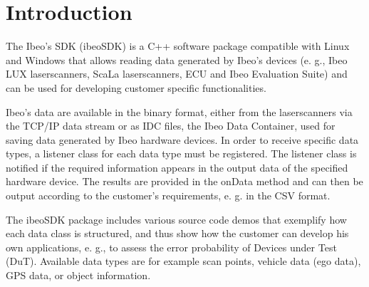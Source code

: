 \section{Introduction}

The Ibeo’s SDK (ibeoSDK) is a C++ software package compatible with Linux and Windows that allows reading data generated by Ibeo's devices (e. g., Ibeo LUX laserscanners,
ScaLa laserscanners, ECU and Ibeo Evaluation Suite) and can be used for developing customer specific functionalities. \hfill \break

Ibeo's data are available in the binary format, either from the laserscanners via the TCP/IP data stream or as IDC files, the Ibeo Data Container, used for saving data generated by Ibeo hardware devices.
In order to receive specific data types, a listener class for each data type must be registered. The listener class is notified if the required information appears in the output data of the specified hardware device. The results are provided in the onData method and can then be output according to the customer’s requirements, e. g. in the CSV format. \hfill \break

The ibeoSDK package includes various source code demos that exemplify how each data class is structured, and thus show how the customer can develop his own applications, e. g., to assess the error probability of Devices under Test (DuT). Available data types are for example scan points, vehicle data (ego data), GPS data, or object information. \hfill \break

\newpage


